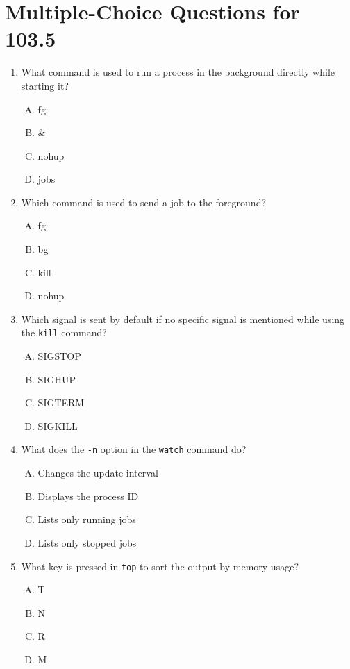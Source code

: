 \documentclass[a4paper]{report}
\begin{document}
\section*{Multiple-Choice Questions for 103.5}
\begin{enumerate}[1.]

    \item What command is used to run a process in the background directly while starting it?  
    \begin{enumerate}[A)]
        \item fg  
        \item \&  
        \item nohup  
        \item jobs  
    \end{enumerate}

    \item Which command is used to send a job to the foreground?  
    \begin{enumerate}[A)]
        \item fg  
        \item bg  
        \item kill  
        \item nohup  
    \end{enumerate}

    \item Which signal is sent by default if no specific signal is mentioned while using the \texttt{kill} command?  
    \begin{enumerate}[A)]
        \item SIGSTOP  
        \item SIGHUP  
        \item SIGTERM  
        \item SIGKILL  
    \end{enumerate}

    \item What does the \texttt{-n} option in the \texttt{watch} command do?  
    \begin{enumerate}[A)]
        \item Changes the update interval  
        \item Displays the process ID  
        \item Lists only running jobs  
        \item Lists only stopped jobs  
    \end{enumerate}

    \item What key is pressed in \texttt{top} to sort the output by memory usage?  
    \begin{enumerate}[A)]
        \item T  
        \item N  
        \item R  
        \item M  
    \end{enumerate}


\end{enumerate}
\end{document}
